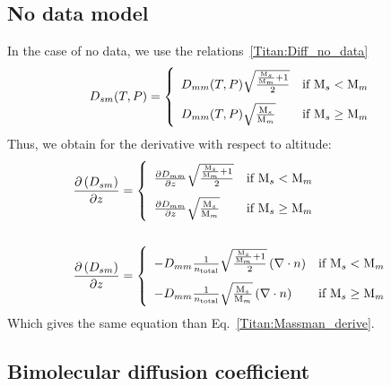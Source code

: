 \subsection{No data model}

In the case of no data, we use the relations~\ref{Titan:Diff_no_data}
\begin{equation}
\renewcommand{\arraystretch}{2}
\diff_{sm}(T,P) =
\left\{\begin{array}{l@{\quad}r}
\diff_{mm}(T,P)\sqrt{\frac{\frac{\Mm_s}{\Mm_m} + 1}{2}} & \text{if }\Mm_s < \Mm_m    \\
\diff_{mm}(T,P)\sqrt{\frac{\Mm_s}{\Mm_m}}               & \text{if }\Mm_s \geq \Mm_m \\
\end{array}\right.
\label{Titan:Diff_no_data}
\end{equation}
Thus, we obtain for the derivative with respect to altitude:
\begin{equation}
\begin{split}
\renewcommand{\arraystretch}{2}
\dOverdz{\diff_{sm}} & =
\left\{\begin{array}{l@{\quad}r}
\doverdz{\diff_{mm}}\sqrt{\frac{\frac{\Mm_s}{\Mm_m} + 1}{2}}  & \text{if } \Mm_s < \Mm_m    \\
\doverdz{\diff_{mm}}\sqrt{\frac{\Mm_s}{\Mm_m}}                & \text{if } \Mm_s \geq \Mm_m \\
\end{array}\right. 
\\\\
\dOverdz{\diff_{sm}} & =
\left\{\begin{array}{l@{\quad}r}
-\diff_{mm}\frac{1}{\concAtm}\sqrt{\frac{\frac{\Mm_s}{\Mm_m} + 1}{2}}\diverge{\conc}  & \text{if } \Mm_s < \Mm_m    \\
-\diff_{mm}\frac{1}{\concAtm}\sqrt{\frac{\Mm_s}{\Mm_m}}\diverge{\conc}                & \text{if } \Mm_s \geq \Mm_m \\
\end{array}\right. 
\end{split}
\label{Titan:diffusion_no_data_derive}
\end{equation}
Which gives the same equation than Eq.~\ref{Titan:Massman_derive}.

\subsection{Bimolecular diffusion coefficient}

